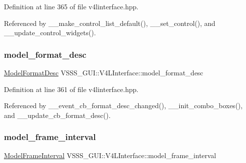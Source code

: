Definition at line 365 of file v4linterface.\+hpp.



Referenced by \+\_\+\+\_\+make\+\_\+control\+\_\+list\+\_\+default(), \+\_\+\+\_\+set\+\_\+control(), and \+\_\+\+\_\+update\+\_\+control\+\_\+widgets().

\mbox{\label{class_v_s_s_s___g_u_i_1_1_v4_l_interface_abd94aec4d6c691967cee26950e179fd1}} 
\subsubsection{\texorpdfstring{model\+\_\+format\+\_\+desc}{model\_format\_desc}}
{\footnotesize\ttfamily \hyperlink{class_v_s_s_s___g_u_i_1_1_v4_l_interface_a9bb7c5c7917abee18c12e6aaa0c4a880}{Model\+Format\+Desc} V\+S\+S\+S\+\_\+\+G\+U\+I\+::\+V4\+L\+Interface\+::model\+\_\+format\+\_\+desc\hspace{0.3cm}{\ttfamily [private]}}



Definition at line 361 of file v4linterface.\+hpp.



Referenced by \+\_\+\+\_\+event\+\_\+cb\+\_\+format\+\_\+desc\+\_\+changed(), \+\_\+\+\_\+init\+\_\+combo\+\_\+boxes(), and \+\_\+\+\_\+update\+\_\+cb\+\_\+format\+\_\+desc().

\mbox{\label{class_v_s_s_s___g_u_i_1_1_v4_l_interface_ae6a12566332a48cf41aa8d4bbea6671e}} 
\subsubsection{\texorpdfstring{model\+\_\+frame\+\_\+interval}{model\_frame\_interval}}
{\footnotesize\ttfamily \hyperlink{class_v_s_s_s___g_u_i_1_1_v4_l_interface_a7813513200948f4605691c33e40e15a9}{Model\+Frame\+Interval} V\+S\+S\+S\+\_\+\+G\+U\+I\+::\+V4\+L\+Interface\+::model\+\_\+frame\+\_\+interval\hspace{0.3cm}{\ttfamily [private]}}



